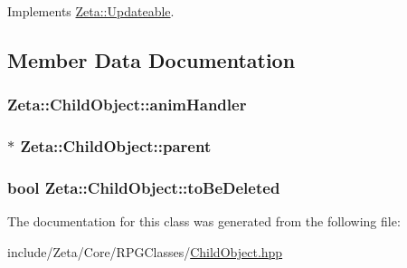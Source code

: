 Implements \hyperlink{classZeta_1_1Updateable_af4006bfccb762454b4da08786ad93de0}{Zeta\+::\+Updateable}.



\subsection{Member Data Documentation}
\hypertarget{classZeta_1_1ChildObject_aa53737b5485a63b87c9e50c5f0b9652b}{
\subsubsection[{anim\+Handler}]{ Zeta\+::\+Child\+Object\+::anim\+Handler\hspace{0.3cm}{\ttfamily [protected]}}}\label{classZeta_1_1ChildObject_aa53737b5485a63b87c9e50c5f0b9652b}
\hypertarget{classZeta_1_1ChildObject_aca8fcd19fdb0291c58a21cd91046e4aa}{
\subsubsection[{parent}]{$\ast$ Zeta\+::\+Child\+Object\+::parent\hspace{0.3cm}{\ttfamily [protected]}}}\label{classZeta_1_1ChildObject_aca8fcd19fdb0291c58a21cd91046e4aa}
\hypertarget{classZeta_1_1ChildObject_aefd99848653386c7e7d98d2f9d66f25d}{
\subsubsection[{to\+Be\+Deleted}]{\setlength{\rightskip}{0pt plus 5cm}bool Zeta\+::\+Child\+Object\+::to\+Be\+Deleted\hspace{0.3cm}{\ttfamily [protected]}}}\label{classZeta_1_1ChildObject_aefd99848653386c7e7d98d2f9d66f25d}


The documentation for this class was generated from the following file\+:\begin{DoxyCompactItemize}
\item 
include/\+Zeta/\+Core/\+R\+P\+G\+Classes/\hyperlink{ChildObject_8hpp}{Child\+Object.\+hpp}\end{DoxyCompactItemize}
